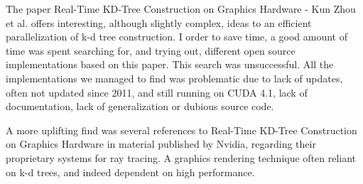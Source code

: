 The paper Real-Time KD-Tree Construction on Graphics Hardware - Kun Zhou et al. offers interesting, although slightly complex, ideas to an efficient parallelization of k-d tree construction. I order to save time, a good amount of time was spent searching for, and trying out, different open source implementations based on this paper. This search was unsuccessful. All the implementations we managed to find was problematic due to lack of updates, often not updated since 2011, and still running on CUDA 4.1, lack of documentation, lack of generalization or dubious source code.

A more uplifting find was several references to Real-Time KD-Tree Construction on Graphics Hardware in material published by Nvidia, regarding their proprietary systems for ray tracing. A graphics rendering technique often reliant on k-d trees, and indeed dependent on high performance.





